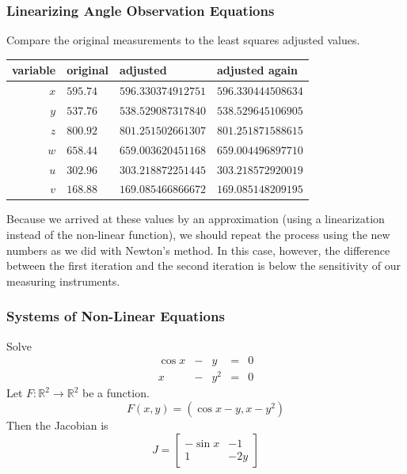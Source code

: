 \documentclass[xcolor=dvipsnames]{beamer}
\begin{document}
\begin{frame}
  \frametitle{Linearizing Angle Observation Equations}
Compare the original measurements to the least squares adjusted
values.

\bigskip

\begin{tabular}{r|l|l|l}
variable & original & adjusted & adjusted again \\ \hline
      $x$ & $595.74$  & $596.330374912751$ & $596.330444508634$ \\ 
      $y$ & $537.76$  & $538.529087317840$ & $538.529645106905$ \\ 
      $z$ & $800.92$  & $801.251502661307$ & $801.251871588615$ \\ 
      $w$ & $658.44$  & $659.003620451168$ & $659.004496897710$ \\ 
      $u$ & $302.96$  & $303.218872251445$ & $303.218572920019$ \\ 
      $v$ & $168.88$  & $169.085466866672$ & $169.085148209195$
\end{tabular}

\bigskip

Because we arrived at these values by an approximation (using a
linearization instead of the non-linear function), we should
repeat the process using the new numbers as we did with Newton's
method. In this case, however, the difference between the first
iteration and the second iteration is below the sensitivity of our
measuring instruments.
\end{frame}

\begin{frame}
  \frametitle{Systems of Non-Linear Equations}
  Solve
  \begin{equation}
    \label{eq:gieghaik}
    \begin{array}{ccccc}
      \cos{}x&-&y&=&0 \\
             x&-&y^{2}&=&0
    \end{array}
  \end{equation}
Let $F:\mathbb{R}^{2}\rightarrow\mathbb{R}^{2}$ be a function.
  \begin{equation}
    \label{eq:cohkacho}
   F(x,y)=\left(\cos{}x-y,x-y^{2}\right)
  \end{equation}
  Then the Jacobian is
  \begin{equation}
    \label{eq:saimalei}
    J=\left[
      \begin{array}{cc}
        -\sin{}x & -1 \\
                 1&-2y
      \end{array}\right]
  \end{equation}
\end{frame}
\end{document}
